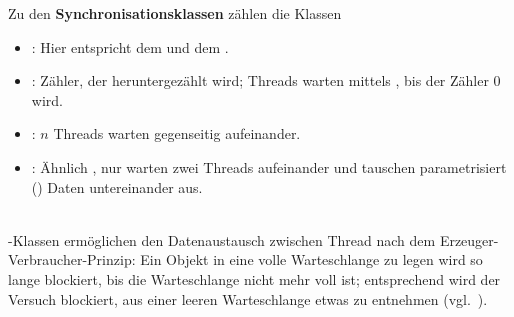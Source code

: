 \noindent
Zu den \textbf{Synchronisationsklassen} zählen die Klassen
\begin{itemize}
    \item {}: Hier entspricht  dem  und  dem .
    \item {}: Zähler, der heruntergezählt wird; Threads warten mittels , bis der Zähler $0$ wird.
    \item {}: $n$ Threads warten gegenseitig aufeinander.
    \item {}: Ähnlich , nur warten zwei Threads aufeinander und tauschen parametrisiert () Daten untereinander aus.
\end{itemize}\\

\noindent
{}-Klassen ermöglichen den  Datenaustausch zwischen Thread nach dem Erzeuger-Verbraucher-Prinzip: Ein Objekt in eine volle Warteschlange zu legen wird so lange blockiert, bis die Warteschlange nicht mehr voll ist; entsprechend wird der Versuch blockiert, aus einer leeren Warteschlange etwas zu entnehmen (vgl.~\cite[164]{Oec22}).